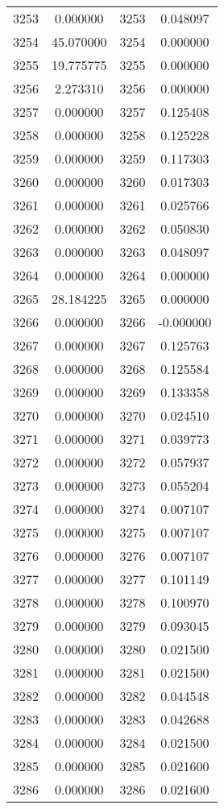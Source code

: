 \documentclass[12pt]{article}
\begin{document}
\begin{longtable}{@{}cccc@{}}
3253 & 0.000000 & 3253 & 0.048097 \\
3254 & 45.070000 & 3254 & 0.000000 \\
3255 & 19.775775 & 3255 & 0.000000 \\
3256 & 2.273310 & 3256 & 0.000000 \\
3257 & 0.000000 & 3257 & 0.125408 \\
3258 & 0.000000 & 3258 & 0.125228 \\
3259 & 0.000000 & 3259 & 0.117303 \\
3260 & 0.000000 & 3260 & 0.017303 \\
3261 & 0.000000 & 3261 & 0.025766 \\
3262 & 0.000000 & 3262 & 0.050830 \\
3263 & 0.000000 & 3263 & 0.048097 \\
3264 & 0.000000 & 3264 & 0.000000 \\
3265 & 28.184225 & 3265 & 0.000000 \\
3266 & 0.000000 & 3266 & -0.000000 \\
3267 & 0.000000 & 3267 & 0.125763 \\
3268 & 0.000000 & 3268 & 0.125584 \\
3269 & 0.000000 & 3269 & 0.133358 \\
3270 & 0.000000 & 3270 & 0.024510 \\
3271 & 0.000000 & 3271 & 0.039773 \\
3272 & 0.000000 & 3272 & 0.057937 \\
3273 & 0.000000 & 3273 & 0.055204 \\
3274 & 0.000000 & 3274 & 0.007107 \\
3275 & 0.000000 & 3275 & 0.007107 \\
3276 & 0.000000 & 3276 & 0.007107 \\
3277 & 0.000000 & 3277 & 0.101149 \\
3278 & 0.000000 & 3278 & 0.100970 \\
3279 & 0.000000 & 3279 & 0.093045 \\
3280 & 0.000000 & 3280 & 0.021500 \\
3281 & 0.000000 & 3281 & 0.021500 \\
3282 & 0.000000 & 3282 & 0.044548 \\
3283 & 0.000000 & 3283 & 0.042688 \\
3284 & 0.000000 & 3284 & 0.021500 \\
3285 & 0.000000 & 3285 & 0.021600 \\
3286 & 0.000000 & 3286 & 0.021600 \\

\end{longtable}
\end{document}
